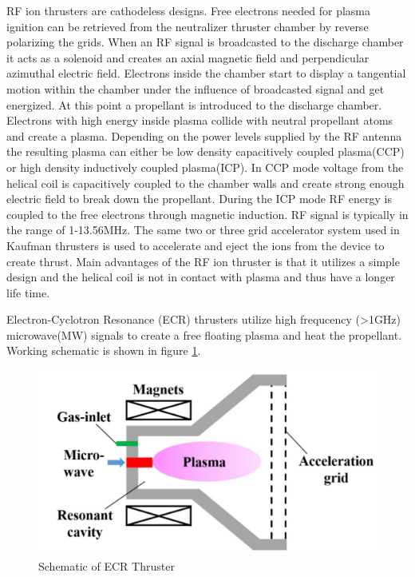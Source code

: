 RF ion thrusters are cathodeless designs. Free electrons needed for plasma ignition can be retrieved from the neutralizer thruster chamber by reverse polarizing the grids. When an RF signal is broadcasted to the discharge chamber it acts as a solenoid and creates an axial magnetic field and perpendicular azimuthal electric field. Electrons inside the chamber start to display a tangential motion within the chamber under the influence of broadcasted signal and get energized. At this point a propellant is introduced to the discharge chamber. Electrons with high energy inside plasma collide with neutral propellant atoms and create a plasma. Depending on the power levels supplied by the RF antenna the resulting plasma can either be low density capacitively coupled plasma(CCP) or high density inductively coupled plasma(ICP). In CCP mode voltage from the helical coil is capacitively coupled to the chamber walls and create strong enough electric field to break down the propellant\cite{farnell2007performance}. During the ICP mode RF energy is coupled to the free electrons through magnetic induction\cite{Bumbarger}. RF signal is typically in the range of 1-13.56MHz\cite{mistoco2004development}.
The same two or three grid accelerator system used in Kaufman thrusters is used to accelerate and eject the ions from the device to create thrust. Main advantages of the RF ion thruster is that it utilizes a simple design and the helical coil is not in contact with plasma and thus have a longer life time. 

Electron-Cyclotron Resonance (ECR) thrusters utilize high frequcency (>1GHz) microwave(MW) signals to create a free floating plasma and heat the propellant. Working schematic is shown in figure \ref{fig:ecrschematic}.

\begin{figure}[ht]
    \centering
    \includegraphics[scale=0.75]{fig/ecr.png}
    \caption[Schematic of ECR Thruster]{Schematic of ECR Thruster\cite{xiaogang2020heating}}
    \label{fig:ecrschematic}
\end{figure}

